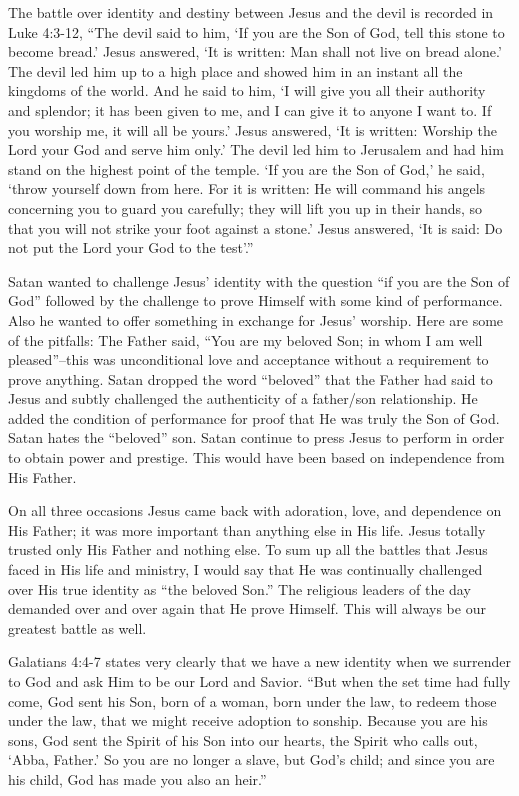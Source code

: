 \documentclass[oneside]{book}
\begin{document}
The battle over identity and destiny between Jesus and the devil is recorded in Luke 4:3-12,  “The devil said to him, ‘If you are the Son of God, tell this stone to become bread.’ Jesus answered, ‘It is written: Man shall not live on bread alone.’ The devil led him up to a high place and showed him in an instant all the kingdoms of the world.  And he said to him, ‘I will give you all their authority and splendor; it has been given to me, and I can give it to anyone I want to.  If you worship me, it will all be yours.’ Jesus answered, ‘It is written: Worship the Lord your God and serve him only.’ The devil led him to Jerusalem and had him stand on the highest point of the temple. ‘If you are the Son of God,’ he said, ‘throw yourself down from here. For it is written: He will command his angels concerning you to guard you carefully; they will lift you up in their hands, so that you will not strike your foot against a stone.’ Jesus answered, ‘It is said: Do not put the Lord your God to the test’.”

Satan wanted to challenge Jesus’ identity with the question “if you are the Son of God” followed by the challenge to prove Himself with some kind of performance. Also he wanted to offer something in exchange for Jesus’ worship. Here are some of the pitfalls:
The Father said, “You are my beloved Son; in whom I am well pleased”--this was unconditional love and acceptance without a requirement to prove anything.
Satan dropped the word “beloved” that the Father had said to Jesus and subtly challenged the authenticity of a father/son relationship. He added the condition of performance for proof that He was truly the Son of God. Satan hates the “beloved” son.
Satan continue to press Jesus to perform in order to obtain power and prestige. This would have been based on independence from His Father.

On all three occasions Jesus came back with adoration, love, and dependence on His Father; it was more important than anything else in His life. Jesus totally trusted only His Father and nothing else. To sum up all the battles that Jesus faced in His life and ministry, I would say that He was continually challenged over His true identity as “the beloved Son.” The religious leaders of the day demanded over and over again that He prove Himself. This will always be our greatest battle as well. 

Galatians 4:4-7 states very clearly that we have a new identity when we surrender to God and ask Him to be our Lord and Savior. “But when the set time had fully come, God sent his Son, born of a woman, born under the law, to redeem those under the law, that we might receive adoption to sonship. Because you are his sons, God sent the Spirit of his Son into our hearts, the Spirit who calls out, ‘Abba, Father.’ So you are no longer a slave, but God’s child; and since you are his child, God has made you also an heir.”
\end{document}
